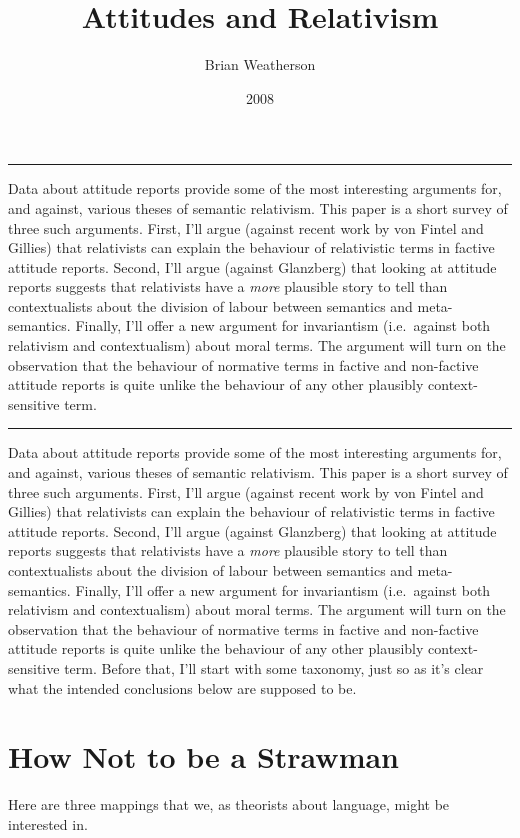 \documentclass[
  10pt,
  letterpaper,
  DIV=11,
  numbers=noendperiod,
  twoside]{scrartcl}
\title{Attitudes and Relativism}
\author{Brian Weatherson}
\date{2008}
\renewenvironment{abstract}
 {\vspace{-1.25cm}
 \quotation\small\noindent\rule{\linewidth}{.5pt}\par\smallskip
 \noindent }
 {\par\noindent\rule{\linewidth}{.5pt}\endquotation}
\begin{document}
\maketitle
\begin{abstract}
Data about attitude reports provide some of the most interesting
arguments for, and against, various theses of semantic relativism. This
paper is a short survey of three such arguments. First, I'll argue
(against recent work by von Fintel and Gillies) that relativists can
explain the behaviour of relativistic terms in factive attitude reports.
Second, I'll argue (against Glanzberg) that looking at attitude reports
suggests that relativists have a \emph{more} plausible story to tell
than contextualists about the division of labour between semantics and
meta-semantics. Finally, I'll offer a new argument for invariantism
(i.e.~against both relativism and contextualism) about moral terms. The
argument will turn on the observation that the behaviour of normative
terms in factive and non-factive attitude reports is quite unlike the
behaviour of any other plausibly context-sensitive term.
\end{abstract}

Data about attitude reports provide some of the most interesting
arguments for, and against, various theses of semantic relativism. This
paper is a short survey of three such arguments. First, I'll argue
(against recent work by von Fintel and Gillies) that relativists can
explain the behaviour of relativistic terms in factive attitude reports.
Second, I'll argue (against Glanzberg) that looking at attitude reports
suggests that relativists have a \emph{more} plausible story to tell
than contextualists about the division of labour between semantics and
meta-semantics. Finally, I'll offer a new argument for invariantism
(i.e.~against both relativism and contextualism) about moral terms. The
argument will turn on the observation that the behaviour of normative
terms in factive and non-factive attitude reports is quite unlike the
behaviour of any other plausibly context-sensitive term. Before that,
I'll start with some taxonomy, just so as it's clear what the intended
conclusions below are supposed to be.

\section{How Not to be a Strawman}\label{how-not-to-be-a-strawman}

Here are three mappings that we, as theorists about language, might be
interested in.
\end{document}
